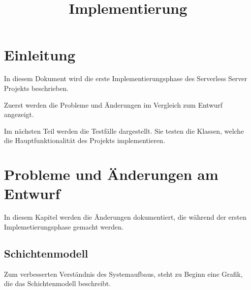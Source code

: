 \documentclass[a4paper,20pt,oneside]{book}
\begin{document}
	\title{\Huge{\bfseries{Implementierung}}}
	\author{}
	\maketitle
	\clearpage
	
	\tableofcontents
	
	\chapter{Einleitung}
	In diesem Dokument wird die erste Implementierungsphase des Serverless Server Projekts beschrieben.
	
	 Zuerst werden die Probleme und Änderungen im Vergleich zum Entwurf angezeigt.
	
	 Im nächsten Teil werden die Testfälle dargestellt. Sie testen die Klassen, welche die Hauptfunktionalität des Projekts implementieren.
	 \vspace{0.5cm}
	 
	\chapter{Probleme und Änderungen am Entwurf}
	In diesem Kapitel werden die Änderungen dokumentiert, die während der ersten Implemetierungsphase gemacht werden. 
	\section{Schichtenmodell}
	Zum verbesserten Verständnis des Systemaufbaus, steht zu Beginn eine Grafik, die das Schichtenmodell beschreibt.
	
\end{document}
